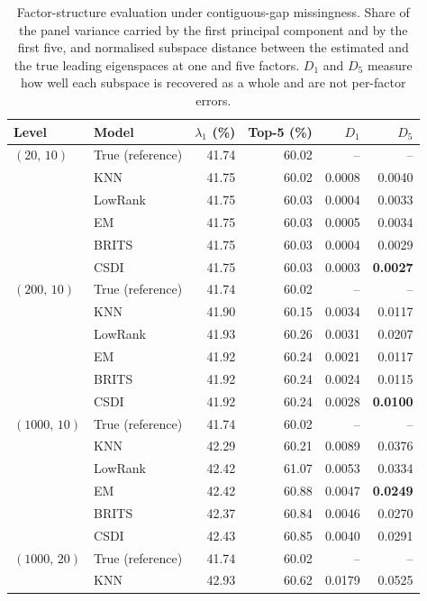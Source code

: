 \begin{table}[htbp]
  \centering
  \footnotesize
  \caption[Factor-structure evaluation under contiguous-gap missingness]{Factor-structure evaluation under contiguous-gap missingness. Share of the panel variance carried by the first principal component and by the first five, and normalised subspace distance between the estimated and the true leading eigenspaces at one and five factors. $D_1$ and $D_5$ measure how well each subspace is recovered as a whole and are not per-factor errors.}
  \label{tab:factors_gaps}
  \begin{tabular}{llrrrr}
    \toprule
    Level & Model & $\lambda_1$ (\%) & Top-5 (\%) & $D_1$ & $D_5$ \\
    \midrule
    $(20,\, 10)$ & True (reference) & 41.74 & 60.02 & -- & -- \\
     & KNN & 41.75 & 60.02 & 0.0008 & 0.0040 \\
     & LowRank & 41.75 & 60.03 & 0.0004 & 0.0033 \\
     & EM & 41.75 & 60.03 & 0.0005 & 0.0034 \\
     & BRITS & 41.75 & 60.03 & 0.0004 & 0.0029 \\
     & CSDI & 41.75 & 60.03 & 0.0003 & \textbf{0.0027} \\
    \midrule
    $(200,\, 10)$ & True (reference) & 41.74 & 60.02 & -- & -- \\
     & KNN & 41.90 & 60.15 & 0.0034 & 0.0117 \\
     & LowRank & 41.93 & 60.26 & 0.0031 & 0.0207 \\
     & EM & 41.92 & 60.24 & 0.0021 & 0.0117 \\
     & BRITS & 41.92 & 60.24 & 0.0024 & 0.0115 \\
     & CSDI & 41.92 & 60.24 & 0.0028 & \textbf{0.0100} \\
    \midrule
    $(1000,\, 10)$ & True (reference) & 41.74 & 60.02 & -- & -- \\
     & KNN & 42.29 & 60.21 & 0.0089 & 0.0376 \\
     & LowRank & 42.42 & 61.07 & 0.0053 & 0.0334 \\
     & EM & 42.42 & 60.88 & 0.0047 & \textbf{0.0249} \\
     & BRITS & 42.37 & 60.84 & 0.0046 & 0.0270 \\
     & CSDI & 42.43 & 60.85 & 0.0040 & 0.0291 \\
    \midrule
    $(1000,\, 20)$ & True (reference) & 41.74 & 60.02 & -- & -- \\
     & KNN & 42.93 & 60.62 & 0.0179 & 0.0525 \\

\end{tabular}
\end{table}
